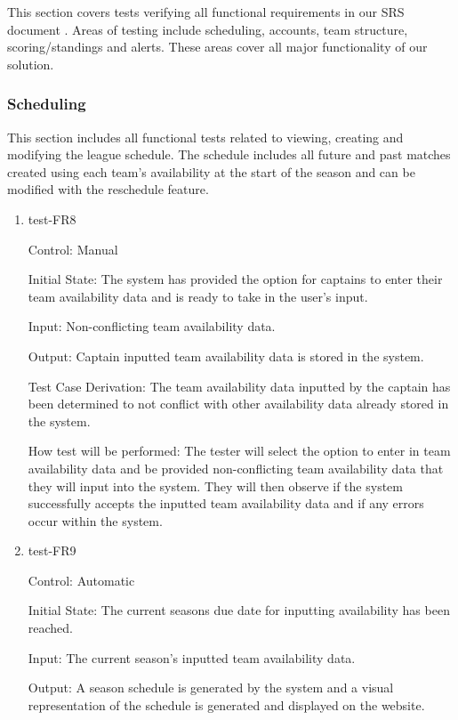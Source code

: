 \documentclass[12pt, titlepage]{article}
\begin{document}
This section covers tests verifying all functional requirements in our SRS
document \cite{SRS}. Areas of testing include scheduling, accounts, team
structure, scoring/standings and alerts. These areas cover all major
functionality of our solution.

\subsubsection{Scheduling}

This section includes all functional tests related to viewing, creating and
modifying the league schedule. The schedule includes all future and past
matches created using each team's availability at the start of the season and
can be modified with the reschedule feature.

\begin{enumerate}

  \item{test-FR8\\}

  Control: Manual

  Initial State: The system has provided the option for captains to enter their team
  availability data and is ready to take in the user's input.

  Input: Non-conflicting team availability data.

  Output: Captain inputted team availability data is stored in the system.

  Test Case Derivation: The team availability data inputted by the captain has been
  determined to not conflict with other availability data already stored in the system.

  How test will be performed: The tester will select the option to enter in team 
  availability data and be provided non-conflicting team availability
  data that they will input into the system. They will then observe if the system successfully
  accepts the inputted team availability data and if any errors occur within the system.

  \item{test-FR9\\}

  Control: Automatic

  Initial State: The current seasons due date for inputting availability
  has been reached.

  Input: The current season's inputted team availability data.

  Output: A season schedule is generated by the system and a visual
  representation of the schedule is generated and displayed on the website.


\end{enumerate}
\end{document}
